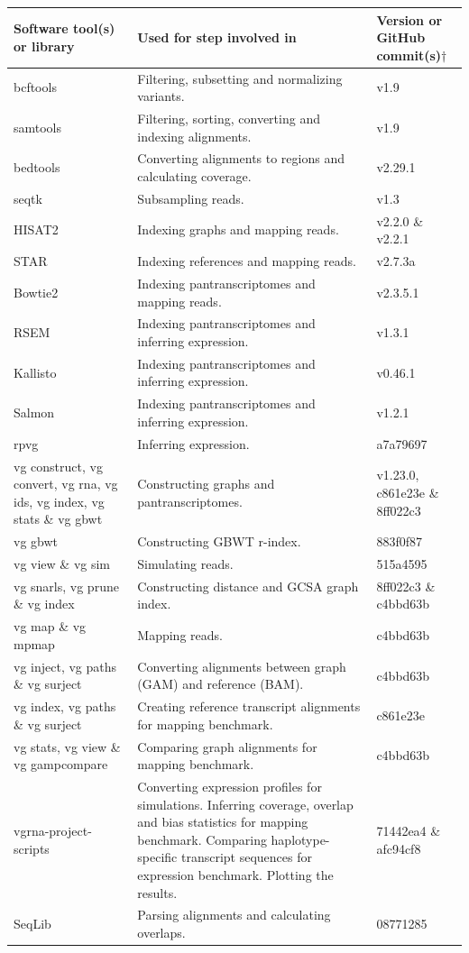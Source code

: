 \documentclass[11pt]{ucthesis}
\begin{document}
\begin{table}[H]
\ssp
\footnotesize
\begin{tabular}{L{0.2\textwidth}| L{0.4\textwidth} | R{0.18\textwidth}}
\textbf{Software tool(s) or library} & \textbf{Used for step involved in} & \textbf{Version or GitHub commit(s)}$\dag$ \\
\midrule
bcftools & Filtering, subsetting and normalizing variants. & v1.9 \\
\midrule
samtools & Filtering, sorting, converting and indexing alignments. & v1.9 \\
\midrule
bedtools & Converting alignments to regions and calculating coverage. & v2.29.1 \\
\midrule
seqtk & Subsampling reads. & v1.3 \\
\midrule
HISAT2 & Indexing graphs and mapping reads. & v2.2.0 \& v2.2.1 \\
\midrule
STAR & Indexing references and mapping reads. & v2.7.3a \\
\midrule
Bowtie2 & Indexing pantranscriptomes and mapping reads. & v2.3.5.1 \\
\midrule
RSEM & Indexing pantranscriptomes and inferring expression. & v1.3.1 \\
\midrule
Kallisto & Indexing pantranscriptomes and inferring expression. & v0.46.1\\
\midrule
Salmon & Indexing pantranscriptomes and inferring expression. & v1.2.1 \\
\midrule
rpvg & Inferring expression. & a7a79697 \\
\midrule
vg construct, vg convert, vg rna, vg ids, vg index, vg stats \& vg gbwt  & Constructing graphs and pantranscriptomes. & v1.23.0, c861e23e \& 8ff022c3 \\
\midrule
vg gbwt & Constructing GBWT r-index. & 883f0f87 \\
\midrule
vg view \& vg sim & Simulating reads. & 515a4595 \\
\midrule
vg snarls, vg prune \& vg index & Constructing distance and GCSA graph index. & 8ff022c3 \& c4bbd63b \\
\midrule
vg map \& vg mpmap & Mapping reads. & c4bbd63b \\
\midrule
vg inject, vg paths \& vg surject & Converting alignments between graph (GAM) and reference (BAM). & c4bbd63b \\
\midrule
vg index, vg paths \& vg surject & Creating reference transcript alignments for mapping benchmark. & c861e23e \\
\midrule
vg stats, vg view \& vg gampcompare & Comparing graph alignments for mapping benchmark. & c4bbd63b \\
\midrule
vgrna-project-scripts & Converting expression profiles for simulations. Inferring coverage, overlap and bias statistics for mapping benchmark. Comparing haplotype-specific transcript sequences for expression benchmark. Plotting the results. & 71442ea4 \& afc94cf8 \\
\midrule
SeqLib & Parsing alignments and calculating overlaps. & 08771285
\end{tabular}


\end{table}
\end{document}
